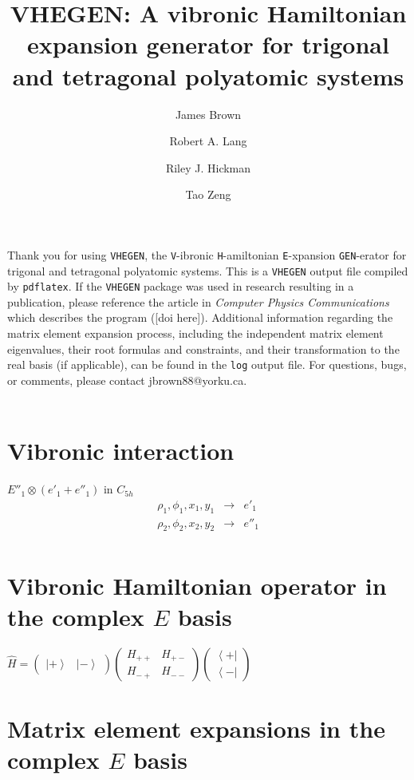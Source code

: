\documentclass[fleqn]{article}
\title{VHEGEN: A vibronic Hamiltonian expansion generator for trigonal and tetragonal polyatomic systems}
\author{James Brown \and Robert A. Lang \and Riley J. Hickman \and Tao Zeng}
\date{}
\begin{document}
\maketitle
Thank you for using \texttt{VHEGEN}, the \texttt{V}-ibronic \texttt{H}-amiltonian \texttt{E}-xpansion \texttt{GEN}-erator for trigonal and tetragonal polyatomic systems. This is a \texttt{VHEGEN} output file compiled by \texttt{pdflatex}. If the \texttt{VHEGEN} package was used in research resulting in a publication, please reference the article in \textit{Computer Physics Communications} which describes the program ([doi here]). Additional information regarding the matrix element expansion process, including the independent matrix element eigenvalues, their root formulas and constraints, and their transformation to the real basis (if applicable), can be found in the \texttt{log} output file. For questions, bugs, or comments, please contact jbrown88@yorku.ca.\\\\
\tableofcontents
\newpage
\section{Vibronic interaction}
$E''_{1} \otimes (e'_{1}+e''_{1})$ in $C_{5h}$
\begin{eqnarray*}
\rho_1,\phi_1,x_1,y_1 &\rightarrow& e'_{1}\\ 
\rho_2,\phi_2,x_2,y_2 &\rightarrow& e''_{1}\\ 
\end{eqnarray*}
\section{Vibronic Hamiltonian operator in the complex $E$ basis}
$\hat{H}=\left(\begin{matrix}{\left|+\right\rangle } & {\left|-\right\rangle }\end{matrix}\right) \left(\begin{matrix}H_{++} & H_{+-}\\H_{-+} & H_{--}\end{matrix}\right) \left(\begin{matrix}{\left\langle +\right|}\\{\left\langle -\right|}\end{matrix}\right)$
\section{Matrix element expansions in the complex $E$ basis}
\end{document}
